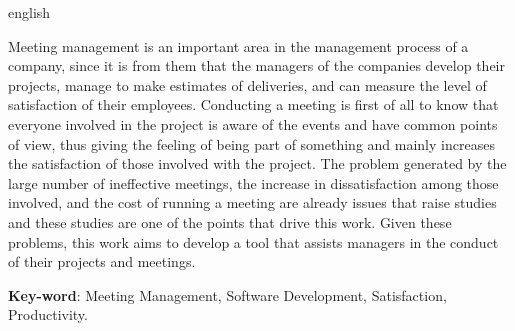 \begin{resumo}[Abstract]
 \begin{otherlanguage*}{english}

  Meeting management is an important area in the management process of a company, since it is from them that the managers of the companies develop their projects, manage to make estimates of deliveries, and can measure the level of satisfaction of their employees. Conducting a meeting is first of all to know that everyone involved in the project is aware of the events and have common points of view, thus giving the feeling of being part of something and mainly increases the satisfaction of those involved with the project. The problem generated by the large number of ineffective meetings, the increase in dissatisfaction among those involved, and the cost of running a meeting are already issues that raise studies and these studies are one of the points that drive this work. Given these problems, this work aims to develop a tool that assists managers in the conduct of their projects and meetings.

   \vspace{\onelineskip}

   \noindent
   \textbf{Key-word}: Meeting Management, Software Development, Satisfaction, Productivity.
 \end{otherlanguage*}
\end{resumo}

